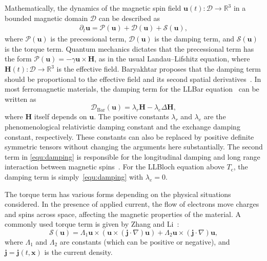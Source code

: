 \documentclass[11pt, reqno]{amsart}
\theoremstyle{definition}
\theoremstyle{remark}
\numberwithin{equation}{section}
\newcommand{\bff}{\boldsymbol}
\newcommand{\bb}{\mathbb}
\begin{document}
\par \medskip

Mathematically, the dynamics of the magnetic spin field $\bff{u}(t):\mathscr{D}\to\bb{R}^3$ in a bounded magnetic domain $\mathscr{D}$ can be described as
\begin{align*}
	\partial_t \bff{u} = \mathcal{P}(\bff{u}) + \mathcal{D}(\bff{u}) + \mathcal{S}(\bff{u}),
\end{align*}
where $\mathcal{P}(\bff{u})$ is the precessional term, $\mathcal{D}(\bff{u})$ is the damping term, and $\mathcal{S}(\bff{u})$ is the torque term. Quantum mechanics dictates that the precessional term has the form $\mathcal{P}(\bff{u})= -\gamma \bff{u}\times \bff{H}$, as in the usual Landau--Lifshitz equation, where $\bff{H}(t):\mathscr{D}\to \bb{R}^3$ is the effective field. Baryakhtar proposes that the damping term should be proportional to the effective field and its second spatial derivatives~\cite{BarBar98, Bar84}. In most ferromagnetic materials, the damping term for the LLBar equation~\cite{WanDvo15} can be written as
\begin{equation}\label{equ:damping}
	\mathcal{D}_{\text{Bar}}(\bff{u}) = \lambda_r \bff{H} - \lambda_e \Delta\bff{H},
\end{equation}
where $\bff{H}$ itself depends on $\bff{u}$. The positive constants $\lambda_r$ and $\lambda_e$ are the phenomenological relativistic damping constant and the exchange damping constant, respectively. These constants can also be replaced by positive definite symmetric tensors without changing the arguments here substantially. The second term in \eqref{equ:damping} is responsible for the longitudinal damping and long range interaction between magnetic spins~\cite{WanDvo15}.  
For the LLBloch equation above $T_\mathrm{c}$, the damping term is simply~\eqref{equ:damping} with $\lambda_e=0$.

The torque term has various forms depending on the physical situations considered. In the presence of applied current, the flow of electrons move charges and spins across space, affecting the magnetic properties of the material. A commonly used torque term is given by Zhang and Li~\cite{ZhaLi04}:
\begin{equation}\label{equ:spin}
	\mathcal{S}(\bff{u})= \Lambda_1 \bff{u}\times (\bff{u}\times (\bff{j}\cdot \nabla)\bff{u}) + \Lambda_2 \bff{u}\times (\bff{j}\cdot \nabla)\bff{u},
\end{equation}
where $\Lambda_1$ and $\Lambda_2$ are constants (which can be positive or negative), and $\bff{j}=\bff{j}(t,\bff{x})$ is the current density.
\end{document}
